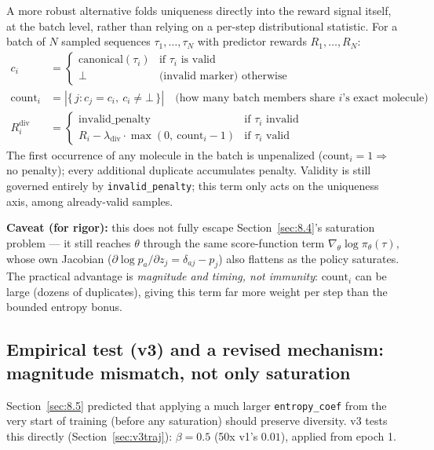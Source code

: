 \documentclass[11pt]{article}
\newcommand{\code}[1]{\texttt{#1}}
\begin{document}
A more robust alternative folds uniqueness directly into the reward signal itself, at the batch level, rather than relying on a per-step distributional statistic. For a batch of $N$ sampled sequences $\tau_1, \ldots, \tau_N$ with predictor rewards $R_1, \ldots, R_N$:
\begin{align}
  c_i &= \begin{cases} \mathrm{canonical}(\tau_i) & \text{if } \tau_i \text{ is valid} \\ \bot & \text{(invalid marker) otherwise} \end{cases} \\
  \mathrm{count}_i &= \left| \{\, j : c_j = c_i,\ c_i \neq \bot \,\} \right| \quad \text{(how many batch members share $i$'s exact molecule)} \\
  R_i^{\mathrm{div}} &= \begin{cases}
    \text{invalid\_penalty} & \text{if } \tau_i \text{ invalid} \\
    R_i - \lambda_{\mathrm{div}} \cdot \max(0,\ \mathrm{count}_i - 1) & \text{if } \tau_i \text{ valid}
  \end{cases}
\end{align}
The first occurrence of any molecule in the batch is unpenalized ($\mathrm{count}_i = 1 \Rightarrow$ no penalty); every additional duplicate accumulates penalty. Validity is still governed entirely by \code{invalid\_penalty}; this term only acts on the uniqueness axis, among already-valid samples.

\textbf{Caveat (for rigor):} this does not fully escape Section~\ref{sec:8.4}'s saturation problem --- it still reaches $\theta$ through the same score-function term $\nabla_\theta \log \pi_\theta(\tau)$, whose own Jacobian ($\partial \log p_a/\partial z_j = \delta_{aj} - p_j$) also flattens as the policy saturates. The practical advantage is \emph{magnitude and timing, not immunity}: $\mathrm{count}_i$ can be large (dozens of duplicates), giving this term far more weight per step than the bounded entropy bonus.

\subsection{Empirical test (v3) and a revised mechanism: magnitude mismatch, not only saturation}
\label{sec:8.7}

Section~\ref{sec:8.5} predicted that applying a much larger \code{entropy\_coef} from the very start of training (before any saturation) should preserve diversity. v3 tests this directly (Section~\ref{sec:v3traj}): $\beta = 0.5$ (50x v1's $0.01$), applied from epoch 1.
\end{document}
